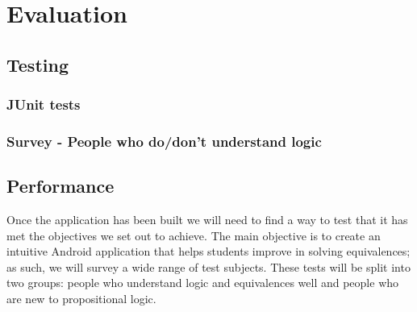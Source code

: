 \documentclass{report}
\begin{document}
\begin{comment}
\item Difficulty Settings - We want to set difficulty in a variety of ways, these include:

\begin{itemize}
\item When generating equivalences, the start formula length can be varied and rules can be applied more or fewer times depending on difficulty.
\item No help functionality for higher difficulties.
\item There is also the possibility of recommending a difficulty for the user based on how many previous equivalences they have completed, or how close their solutions have been to the optimum.
\end{itemize}

\item Extra operators - New operators could be added to the grammar such as XOR and NAND. These could be implemented as a separate grammar and they are likely to be used separately from the standard set of operators.
\end{itemize}

\end{enumerate}

\end{comment}

\chapter{Evaluation}
\section{Testing}
\subsection{JUnit tests}
\subsection{Survey - People who do/don't understand logic}

\section{Performance}

Once the application has been built we will need to find a way to test that it has met the objectives we set out to achieve. The main objective is to create an intuitive Android application that helps students improve in solving equivalences; as such, we will survey a wide range of test subjects. These tests will be split into two groups: people who understand logic and equivalences well and people who are new to propositional logic.
\end{document}
